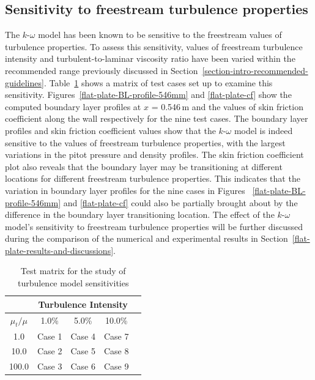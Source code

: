 \subsection{Sensitivity to freestream turbulence properties}
\label{flat-plate-sensitivity}
%
The $k$-$\omega$ model has been known to be sensitive to the freestream 
values of turbulence properties. To assess this sensitivity, values of 
freestream turbulence intensity and turbulent-to-laminar viscosity ratio 
have been varied within the recommended range previously discussed in 
Section~\ref{section-intro-recommended-guidelines}. Table~\ref{sensitivity-study-matrix} 
shows a matrix of test cases set up to examine this sensitivity. 
Figures~\ref{flat-plate-BL-profile-546mm} and \ref{flat-plate-cf} show the computed boundary layer profiles
at $x$ = 0.546\,m and the values of skin friction coefficient along the wall respectively for the nine test cases.
The boundary layer profiles and skin friction coefficient values show that the $k$-$\omega$ model 
is indeed sensitive to the values of freestream turbulence properties, with the largest variations
in the pitot pressure and density profiles. The skin friction coefficient plot also reveals that
the boundary layer may be transitioning at different locations for different freestream turbulence properties.
This indicates that the variation in boundary layer profiles for the nine cases 
in Figures ~\ref{flat-plate-BL-profile-546mm} 
and \ref{flat-plate-cf} could also be partially brought about by the difference
in the boundary layer transitioning location. The effect of the $k$-$\omega$ model's sensitivity to freestream 
turbulence properties will be further discussed during the comparison of the numerical and experimental results
in Section~\ref{flat-plate-results-and-discussions}.
\begin{table}[h]
  \caption{Test matrix for the study of turbulence model sensitivities}
  \label{sensitivity-study-matrix}
  \begin{center}
    \begin{tabular}{ccccl}
      \hline\hline
      & \multicolumn{3}{c}{Turbulence Intensity} \\
      \hline
      $\mu_t/\mu$ & 1.0\%  & 5.0\%  & 10.0\% \\
      \hline
      1.0     &  Case 1    &  Case 4    &  Case 7   \\
      10.0    &  Case 2    &  Case 5    &  Case 8   \\
      100.0   &  Case 3    &  Case 6    &  Case 9   \\
      \hline \hline
    \end{tabular}
  \end{center}
\end{table}
